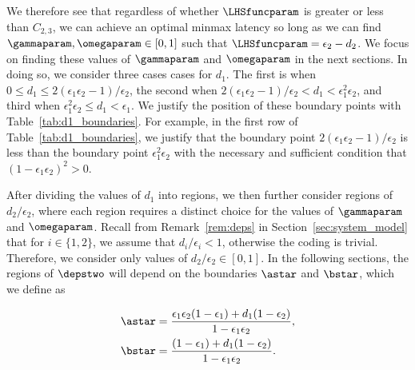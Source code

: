 We therefore see that regardless of whether $\LHSfuncparam$ is greater or less than $C_{2, 3}$, we can achieve an optimal minmax latency so long as we can find $\gammaparam, \omegaparam \in [0, 1]$ such that $\LHSfuncparam = \epsilon_2 - d_2$.   We focus on finding these values of $\gammaparam$ and $\omegaparam$ in the next sections. In doing so, we consider three cases cases for $d_1$.  The first is when $0 \leq d_1 \leq 2(\epsilon_1\epsilon_2 - 1)/\epsilon_2$, the second when $2(\epsilon_1\epsilon_2 - 1)/\epsilon_2 < d_1 < \epsilon_1^2\epsilon_2$, and third when $\epsilon_1^2\epsilon_2 \leq d_1 < \epsilon_1$.  We justify the position of these boundary points with Table~\ref{tab:d1_boundaries}.  For example, in the first row of Table~\ref{tab:d1_boundaries}, we justify that the boundary point $2(\epsilon_1\epsilon_2 - 1)/\epsilon_2$ is less than the boundary point $\epsilon_1^2\epsilon_2$ with the necessary and sufficient condition that $(1 - \epsilon_1\epsilon_2)^2 > 0$.  

After dividing the values of $d_1$ into regions, we then further consider regions of $d_2/\epsilon_2$, where each region requires a distinct choice for the values of $\gammaparam$ and $\omegaparam$.  Recall from Remark~\ref{rem:deps} in Section~\ref{sec:system_model} that for $i \in \{1, 2\}$, we assume that $d_i/\epsilon_i < 1$, otherwise the coding is trivial.  Therefore, we consider only values of $d_2/\epsilon_2 \in [0, 1]$.  In the following sections, the regions of $\depstwo$ will depend on the boundaries $\astar$ and $\bstar$, which we define as


\begin{align}
	\astar &= \frac{\epsilon_1\epsilon_2(1 - \epsilon_1) + d_1(1 - \epsilon_2)}{1 - \epsilon_1\epsilon_2}, \\
	\bstar &= \frac{(1 - \epsilon_1) + d_1(1 - \epsilon_2)}{1 - \epsilon_1\epsilon_2}.
\end{align}

